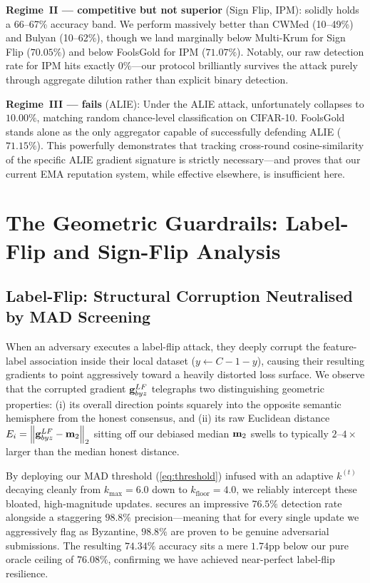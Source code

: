 \documentclass[../main.tex]{subfiles}
\begin{document}
\textbf{Regime~II — \aegis{} competitive but not superior} (Sign Flip, IPM): \aegis{} solidly holds a 66--67\% accuracy band. We perform massively better than CWMed (10--49\%) and Bulyan (10--62\%), though we land marginally below Multi-Krum for Sign Flip ($70.05\%$) and below FoolsGold for IPM ($71.07\%$). Notably, our raw detection rate for IPM hits exactly $0\%$---our protocol brilliantly survives the attack purely through aggregate dilution rather than explicit binary detection.

\textbf{Regime~III — \aegis{} fails} (ALIE): Under the ALIE attack, \aegis{} unfortunately collapses to $10.00\%$, matching random chance-level classification on CIFAR-10. FoolsGold stands alone as the only aggregator capable of successfully defending ALIE ($71.15\%$). This powerfully demonstrates that tracking cross-round cosine-similarity of the specific ALIE gradient signature is strictly necessary---and proves that our current EMA reputation system, while effective elsewhere, is insufficient here.

\section{The Geometric Guardrails: Label-Flip and Sign-Flip Analysis}
\label{sec:results_geometric}

\subsection{Label-Flip: Structural Corruption Neutralised by MAD Screening}
\label{sec:results_label_flip}

When an adversary executes a label-flip attack, they deeply corrupt the feature-label association inside their local dataset ($y \leftarrow C - 1 - y$), causing their resulting gradients to point aggressively toward a heavily distorted loss surface. We observe that the corrupted gradient $\mathbf{g}_{byz}^{LF}$ telegraphs two distinguishing geometric properties: (i) its overall direction points squarely into the opposite semantic hemisphere from the honest consensus, and (ii) its raw Euclidean distance $E_i = \left\lVert \mathbf{g}_{byz}^{LF} - \mathbf{m}_{2} \right\rVert_2$ sitting off our debiased median $\mathbf{m}_{2}$ swells to typically $2$--$4\times$ larger than the median honest distance.

By deploying our MAD threshold (\cref{eq:threshold}) infused with an adaptive $k^{(t)}$ decaying cleanly from $k_{\max}=6.0$ down to $k_{\text{floor}}=4.0$, we reliably intercept these bloated, high-magnitude updates. \aegis{} secures an impressive $76.5\%$ detection rate alongside a staggering $98.8\%$ precision---meaning that for every single update we aggressively flag as Byzantine, $98.8\%$ are proven to be genuine adversarial submissions. The resulting $74.34\%$ accuracy sits a mere $1.74$pp below our pure oracle ceiling of $76.08\%$, confirming we have achieved near-perfect label-flip resilience.
\end{document}

